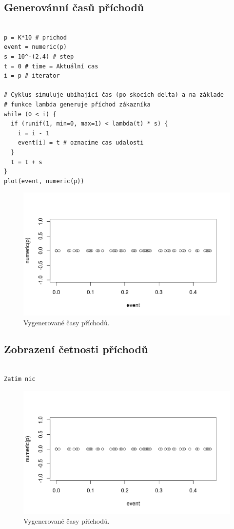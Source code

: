 \documentclass[12pt]{article}
\begin{document}
\subsection{Generovánní časů příchodů}
 \begin{lstlisting}[frame=single]  % Start your code-block
  
p = K*10 # prichod
event = numeric(p)
s = 10^-(2.4) # step
t = 0 # time = Aktuální cas
i = p # iterator

# Cyklus simuluje ubíhající čas (po skocích delta) a na základe
# funkce lambda generuje příchod zákazníka
while (0 < i) {
  if (runif(1, min=0, max=1) < lambda(t) * s) {
    i = i - 1
    event[i] = t # oznacime cas udalosti
  }
  t = t + s
} 
plot(event, numeric(p))
\end{lstlisting}
\begin{figure}[ht!]
	\includegraphics[scale=0.5]{img/2_2_casy_prichodu}\centering
	\caption{Vygenerované časy příchodů.}
	\label{obr:sikme}
\end{figure}

\subsection{Zobrazení četnosti příchodů}
 \begin{lstlisting}[frame=single]  % Start your code-block
  
Zatim nic
\end{lstlisting}
\begin{figure}[ht!]
	\includegraphics[scale=0.5]{img/2_2_casy_prichodu}\centering
	\caption{Vygenerované časy příchodů.}
	\label{obr:sikme}
\end{figure}
\end{document}
